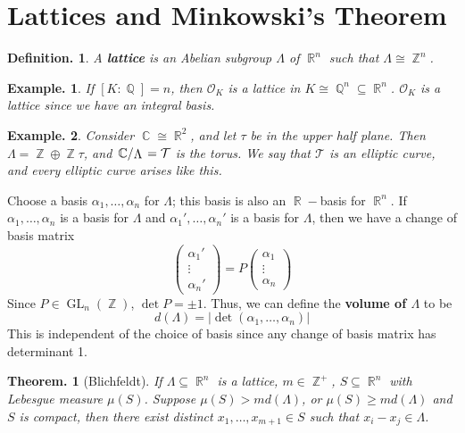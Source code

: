 \documentclass[11pt, a4paper]{memoir}
\DeclareMathOperator{\Q}{{\mathbb{Q}}}
\DeclareMathOperator{\Z}{{\mathbb{Z}}}
\DeclareMathOperator{\R}{{\mathbb{R}}}
\DeclareMathOperator{\C}{{\mathbb{C}}}
\theoremstyle{change}
\newtheorem{theorem}{Theorem.}[section]
\theoremstyle{plain}
\theoremstyle{nonumberplain}
\newtheorem{definition}{Definition.}
\newtheorem{example}{Example.}
\DeclareMathOperator{\GL}{GL}
\newcommand{\quot}[2]{\mathchoice{\left.\raisebox{0.14em}{$#1$}\middle/\raisebox{-0.14em}{$#2$}\right.}
                                 {\left.\raisebox{0.08em}{$#1$}\middle/\raisebox{-0.08em}{$#2$}\right.}
                                 {\left.\raisebox{0.03em}{$#1$}\middle/\raisebox{-0.03em}{$#2$}\right.}
                                 {\left.\raisebox{0em}{$#1$}\middle/\raisebox{0em}{$#2$}\right.}}
\numberwithin{equation}{section}
\begin{document}
\section{Lattices and Minkowski's Theorem}
\begin{definition}
    A \textbf{lattice} is an Abelian subgroup $\Lambda$ of $\R^n$ such that $\Lambda\cong\Z^n$.
\end{definition}
\begin{example}
    If $[K:\Q]=n$, then $\mathcal{O}_K$ is a lattice in $K\cong\Q^n\subseteq\R^n$.
    $\mathcal{O}_K$ is a lattice since we have an integral basis.
\end{example}
\begin{example}
    Consider $\C\cong\R^2$, and let $\tau$ be in the upper half plane.
    Then $\Lambda=\Z\oplus\Z\tau$, and $\quot{\C}{\Lambda}=\mathcal{T}$ is the torus.
    We say that $\mathcal{T}$ is an elliptic curve, and every elliptic curve arises like this.
\end{example}
Choose a basis $\alpha_1,\ldots,\alpha_n$ for $\Lambda$; this basis is also an $\R-$basis for $\R^n$.
If $\alpha_1,\ldots,\alpha_n$ is a basis for $\Lambda$ and $\alpha_1',\ldots,\alpha_n'$ is a basis for $\Lambda$, then we have a change of basis matrix
\begin{equation*}
    \begin{pmatrix}\alpha_1'\\\vdots\\\alpha_n'\end{pmatrix}=P\begin{pmatrix}\alpha_1\\\vdots\\\alpha_n\end{pmatrix}
\end{equation*}
Since $P\in\GL_n(\Z)$, $\det P=\pm 1$.
Thus, we can define the \textbf{volume of $\Lambda$} to be
\begin{equation*}
    d(\Lambda)=|\det(\alpha_1,\ldots,\alpha_n)|
\end{equation*}
This is independent of the choice of basis since any change of basis matrix has determinant 1.
\begin{theorem}[Blichfeldt]
    If $\Lambda\subseteq\R^n$ is a lattice, $m\in\Z^+$, $S\subseteq\R^n$ with Lebesgue measure $\mu(S)$.
    Suppose $\mu(S)>md(\Lambda)$, or $\mu(S)\geq md(\Lambda)$ and $S$ is compact, then there exist distinct $x_1,\ldots,x_{m+1}\in S$ such that $x_i-x_j\in\Lambda$.
\end{theorem}
\end{document}
